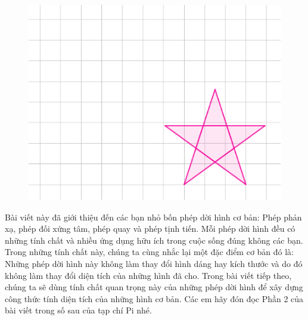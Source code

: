 \begin{multicols}{2}
\begin{figure}[H]
		\vspace*{-5pt}
		\centering
		\captionsetup{labelformat= empty, justification=centering}
		\includegraphics[width= 1\linewidth]{Picture39}
		\vspace*{-10pt}
	\end{figure}
	Bài viết này đã giới thiệu đến các bạn nhỏ bốn phép dời hình cơ bản: Phép phản xạ, phép đối xứng tâm, phép quay và phép tịnh tiến. Mỗi phép dời hình đều có những tính chất và nhiều ứng dụng hữu ích trong cuộc sống đúng không các bạn. Trong những tính chất này, chúng ta cùng nhắc lại một đặc điểm cơ bản đó là: Những phép dời hình này không làm thay đổi hình dáng hay kích thước và do đó không làm thay đổi diện tích của những hình đã cho. Trong bài viết tiếp theo, chúng ta sẽ dùng tính chất quan trọng này của những phép dời hình để xây dựng công thức tính diện tích của những hình cơ bản. Các em hãy đón đọc Phần 2 của bài viết trong số sau của tạp chí Pi nhé.
\end{multicols}
